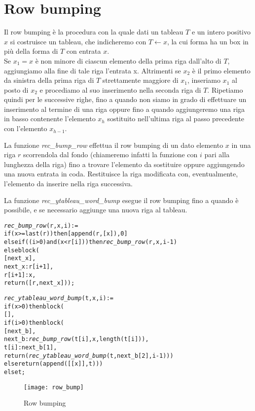 \section{Row bumping}
Il row bumping \`e la procedura con la quale dati un tableau $T$ e un
intero positivo $x$ si costruisce un tableau, che indicheremo con $T
\gets x$, la cui forma ha un box in pi\`u della forma di $T$ con
entrata $x$.\\
Se $x_1 = x$ \`e non minore di ciascun elemento della prima riga
dall'alto di $T$, aggiungiamo alla fine di tale riga l'entrata x.
Altrimenti se $x_2$ \`e il primo elemento da sinistra della prima riga
di $T$ strettamente maggiore di $x_1$, inseriamo $x_1$ al posto di
$x_2$ e procediamo al suo inserimento nella seconda riga di $T$.
Ripetiamo quindi per le successive righe, fino a quando non siamo in
grado di effettuare un inserimento al termine di una riga oppure fino
a quando aggiungeremo una riga in basso contenente l'elemento $x_h$
sostituito nell'ultima riga al passo precedente con l'elemento
$x_{h-1}$.

La funzione \emph{rec\_bump\_row} effettua il row bumping di un dato
elemento $x$ in una riga $r$ scorrendola dal fondo (chiameremo infatti
la funzione con $i$ pari alla lunghezza della riga) fino a trovare
l'elemento da sostituire oppure aggiungendo una nuova entrata in coda.
Restituisce la riga modificata con, eventualmente, l'elemento da
inserire nella riga successiva.

La funzione \emph{rec\_ytableau\_word\_bump} esegue il row bumping
fino a quando \`e possibile, e se necessario aggiunge una nuova riga
al tableau.

\begin{alltt}
\emph{rec\_bump\_row} (r, x, i) :=
if (x >= last (r)) then [append (r, [x]), 0]
else if ((i > 0) and (x < r[i])) then \emph{rec\_bump\_row} (r, x, i-1)
else block (
  [next\_x],
  next\_x : r[i+1],
  r[i+1] : x,
  return ([r, next\_x]));

\emph{rec\_ytableau\_word\_bump} (t, x, i) :=
if (x > 0) then block (
  [],
  if (i > 0) then block (
    [next\_b],
    next\_b : \emph{rec\_bump\_row} (t[i], x, length (t[i])),
    t[i] : next\_b[1],
    return (\emph{rec\_ytableau\_word\_bump} (t, next\_b[2], i-1)))
  else return (append ([[x]], t)))
else t;
\end{alltt}

\begin{figure}[h]
\centering
\texttt{[image: row\_bump]}
\caption{Row bumping}
\end{figure}

